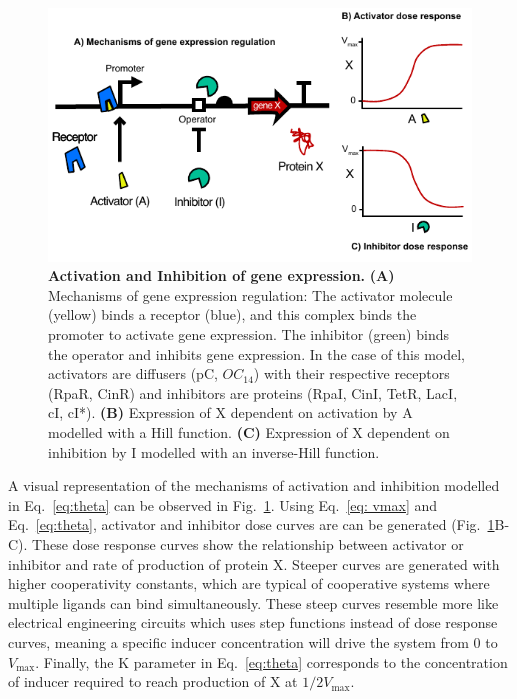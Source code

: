 \begin{figure}[H] %
    \centering
    \begin{adjustbox}{center}
        \includegraphics[width=1\textwidth]{chapters/Chapter 2/activation_inhibition2} %
    \end{adjustbox}
    \caption{\textbf{Activation and Inhibition of gene expression.} \textbf{(A)} Mechanisms of gene expression regulation: The activator molecule (yellow) binds a receptor (blue), and this complex binds the promoter to activate gene expression. The inhibitor (green) binds the operator and inhibits gene expression. In the case of this model, activators are diffusers (pC, $OC_{14}$) with their respective receptors (RpaR, CinR) and inhibitors are proteins (RpaI, CinI, TetR, LacI, cI, cI*). \textbf{(B)} Expression of X dependent on activation by A modelled with a Hill function. \textbf{(C)} Expression of X dependent on inhibition by I modelled with an inverse-Hill function. }
    \label{fig:activation_inhibition} %
\end{figure}

A visual representation of the mechanisms of activation and inhibition modelled in Eq.~\ref{eq:theta} can be observed in Fig.~\ref{fig:activation_inhibition}.
Using Eq.~\ref{eq: vmax} and Eq.~\ref{eq:theta}, activator and inhibitor dose curves are can be generated (Fig.~\ref{fig:activation_inhibition}B-C).
These dose response curves show the relationship between activator or inhibitor and rate of production of protein X.
Steeper curves are generated with higher cooperativity constants, which are typical of cooperative systems where multiple ligands can bind simultaneously.
These steep curves resemble more like electrical engineering circuits which uses step functions instead of dose response curves, meaning a specific inducer concentration will drive the system from 0 to $V_{\max}$.
Finally, the K parameter in Eq.~\ref{eq:theta} corresponds to the concentration of inducer required to reach production of X at  $1/2 V_{\max}$.


